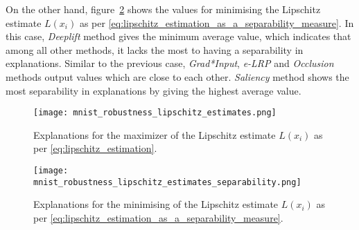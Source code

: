 \documentclass[english]{tktltiki2}
\theoremstyle{definition}
\theoremstyle{remark}
\begin{document}
On the other hand, figure~\ref{fig:mnist_robustness_lipschitz_estimates_separability} shows the values for minimising the Lipschitz estimate $L(x_i)$ as per \eqref{eq:lipschitz_estimation_as_a_separability_measure}. In this case, \textit{Deeplift} method gives the minimum average value, which indicates that among all other methods, it lacks the most to having a separability in explanations. Similar to the previous case, \textit{Grad*Input}, \textit{e-LRP} and \textit{Occlusion} methods output values which are close to each other. \textit{Saliency} method shows the most separability in explanations by giving the highest average value.

\begin{figure}[H]
	\texttt{[image: mnist\_robustness\_lipschitz\_estimates.png]}
	\vspace*{-5mm}
	\caption{Explanations for the maximizer of the Lipschitz estimate $L(x_i)$ as per \eqref{eq:lipschitz_estimation}.}
	\label{fig:mnist_robustness_lipschitz_estimates}
\end{figure}


\begin{figure}[H]
	\texttt{[image: mnist\_robustness\_lipschitz\_estimates\_separability.png]}
	\vspace*{-5mm}
	\caption{Explanations for the minimising of the Lipschitz estimate $L(x_i)$ as per \eqref{eq:lipschitz_estimation_as_a_separability_measure}.}
	\label{fig:mnist_robustness_lipschitz_estimates_separability}
\end{figure} 



\end{document}
